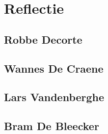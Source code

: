 \documentclass{hogent-report}
\begin{document}
  \chapter{Reflectie}
  
  \section{Robbe Decorte}
  
  \section{Wannes De Craene}
  
  \section{Lars Vandenberghe}
  
  \section{Bram De Bleecker}
  
\end{document}
